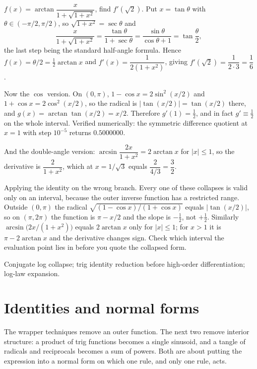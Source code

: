 \begin{worked}
$f(x)=\arctan\dfrac{x}{1+\sqrt{1+x^{2}}}$, find $f'(\sqrt2)$. Put $x=\tan\theta$ with $\theta\in(-\pi/2,\pi/2)$, so $\sqrt{1+x^{2}}=\sec\theta$ and
\[
\frac{x}{1+\sqrt{1+x^{2}}}=\frac{\tan\theta}{1+\sec\theta}=\frac{\sin\theta}{\cos\theta+1}=\tan\frac{\theta}{2},
\]
the last step being the standard half-angle formula. Hence $f(x)=\theta/2=\tfrac12\arctan x$ and $f'(x)=\dfrac{1}{2(1+x^{2})}$, giving $f'(\sqrt2)=\dfrac{1}{2\cdot3}=\dfrac16$.

Now the $\cos$ version. On $(0,\pi)$, $1-\cos x=2\sin^{2}(x/2)$ and $1+\cos x=2\cos^{2}(x/2)$, so the radical is $\lvert\tan(x/2)\rvert=\tan(x/2)$ there, and $g(x)=\arctan\tan(x/2)=x/2$. Therefore $g'(1)=\tfrac12$, and in fact $g'\equiv\tfrac12$ on the whole interval. Verified numerically: the symmetric difference quotient at $x=1$ with step $10^{-5}$ returns $0.5000000$.

And the double-angle version: $\arcsin\dfrac{2x}{1+x^{2}}=2\arctan x$ for $\lvert x\rvert\leq1$, so the derivative is $\dfrac{2}{1+x^{2}}$, which at $x=1/\sqrt3$ equals $\dfrac{2}{4/3}=\dfrac32$.
\end{worked}

\begin{trap}
Applying the identity on the wrong branch. Every one of these collapses is valid only on an interval, because the outer inverse function has a restricted range. Outside $(0,\pi)$ the radical $\sqrt{(1-\cos x)/(1+\cos x)}$ equals $\lvert\tan(x/2)\rvert$, so on $(\pi,2\pi)$ the function is $\pi-x/2$ and the slope is $-\tfrac12$, not $+\tfrac12$. Similarly $\arcsin\bigl(2x/(1+x^{2})\bigr)$ equals $2\arctan x$ only for $\lvert x\rvert\leq1$; for $x>1$ it is $\pi-2\arctan x$ and the derivative changes sign. Check which interval the evaluation point lies in before you quote the collapsed form.
\end{trap}

\begin{seealsob}Conjugate log collapse; trig identity reduction before high-order differentiation; log-law expansion.\end{seealsob}

\section{Identities and normal forms}

The wrapper techniques remove an outer function. The next two remove interior structure: a product of trig functions becomes a single sinusoid, and a tangle of radicals and reciprocals becomes a sum of powers. Both are about putting the expression into a normal form on which one rule, and only one rule, acts.

